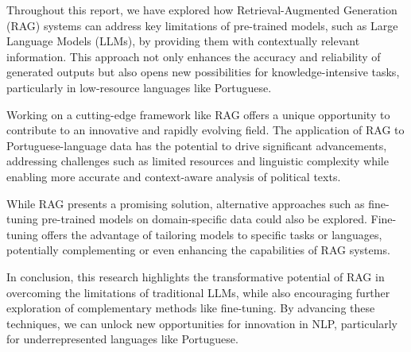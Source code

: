 
Throughout this report, we have explored how Retrieval-Augmented Generation (RAG) systems can address key limitations of pre-trained models, such as Large Language Models (LLMs), by providing them with contextually relevant information. This approach not only enhances the accuracy and reliability of generated outputs but also opens new possibilities for knowledge-intensive tasks, particularly in low-resource languages like Portuguese.

Working on a cutting-edge framework like RAG offers a unique opportunity to contribute to an innovative and rapidly evolving field. The application of RAG to Portuguese-language data has the potential to drive significant advancements, addressing challenges such as limited resources and linguistic complexity while enabling more accurate and context-aware analysis of political texts.

While RAG presents a promising solution, alternative approaches such as fine-tuning pre-trained models on domain-specific data could also be explored. Fine-tuning offers the advantage of tailoring models to specific tasks or languages, potentially complementing or even enhancing the capabilities of RAG systems.

In conclusion, this research highlights the transformative potential of RAG in overcoming the limitations of traditional LLMs, while also encouraging further exploration of complementary methods like fine-tuning. By advancing these techniques, we can unlock new opportunities for innovation in NLP, particularly for underrepresented languages like Portuguese.
